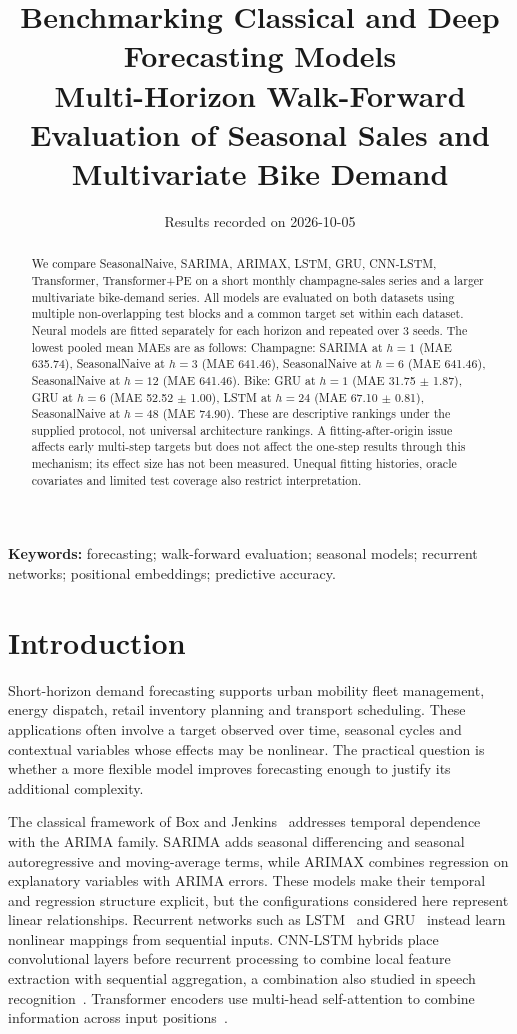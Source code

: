 \documentclass[10pt,a4paper]{article}
\title{\textbf{Benchmarking Classical and Deep Forecasting Models}\\[5pt]\large Multi-Horizon Walk-Forward Evaluation of Seasonal Sales and Multivariate Bike Demand}
\author{}
\date{Results recorded on 2026-10-05}
\begin{document}
\maketitle
\begin{abstract}
We compare SeasonalNaive, SARIMA, ARIMAX, LSTM, GRU, CNN-LSTM, Transformer, Transformer+PE on a short monthly champagne-sales series and a larger multivariate bike-demand series. All models are evaluated on both datasets using multiple non-overlapping test blocks and a common target set within each dataset. Neural models are fitted separately for each horizon and repeated over 3 seeds. The lowest pooled mean MAEs are as follows: Champagne: SARIMA at $h=1$ (MAE 635.74), SeasonalNaive at $h=3$ (MAE 641.46), SeasonalNaive at $h=6$ (MAE 641.46), SeasonalNaive at $h=12$ (MAE 641.46). Bike: GRU at $h=1$ (MAE 31.75 $\pm$ 1.87), GRU at $h=6$ (MAE 52.52 $\pm$ 1.00), LSTM at $h=24$ (MAE 67.10 $\pm$ 0.81), SeasonalNaive at $h=48$ (MAE 74.90). These are descriptive rankings under the supplied protocol, not universal architecture rankings. A fitting-after-origin issue affects early multi-step targets but does not affect the one-step results through this mechanism; its effect size has not been measured. Unequal fitting histories, oracle covariates and limited test coverage also restrict interpretation.
\end{abstract}
\noindent\textbf{Keywords:} forecasting; walk-forward evaluation; seasonal models; recurrent networks; positional embeddings; predictive accuracy.

\section{Introduction}
Short-horizon demand forecasting supports urban mobility fleet management, energy dispatch, retail inventory planning and transport scheduling. These applications often involve a target observed over time, seasonal cycles and contextual variables whose effects may be nonlinear. The practical question is whether a more flexible model improves forecasting enough to justify its additional complexity.

The classical framework of Box and Jenkins~\cite{box1970} addresses temporal dependence with the ARIMA family. SARIMA adds seasonal differencing and seasonal autoregressive and moving-average terms, while ARIMAX combines regression on explanatory variables with ARIMA errors. These models make their temporal and regression structure explicit, but the configurations considered here represent linear relationships. Recurrent networks such as LSTM~\cite{hochreiter1997} and GRU~\cite{cho2014} instead learn nonlinear mappings from sequential inputs. CNN-LSTM hybrids place convolutional layers before recurrent processing to combine local feature extraction with sequential aggregation, a combination also studied in speech recognition~\cite{sainath2015}. Transformer encoders use multi-head self-attention to combine information across input positions~\cite{vaswani2017}.
\end{document}
